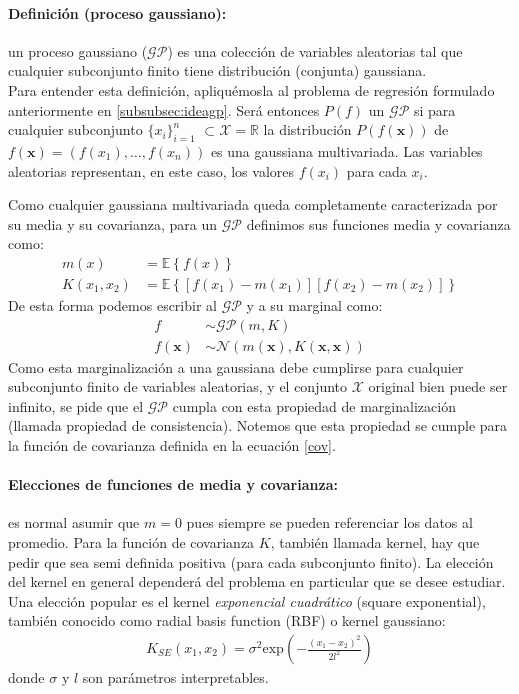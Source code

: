 \documentclass[a4paper]{article}
\newcommand{\gp}{\ensuremath{\mathcal{GP}}}
\begin{document}
\paragraph{Definición (proceso gaussiano):} un proceso gaussiano ($\gp$) es una colección de variables aleatorias tal que cualquier subconjunto finito tiene distribución (conjunta) gaussiana.\\

Para entender esta definición, apliquémosla al problema de regresión formulado anteriormente en \ref{subsubsec:ideagp}. Será entonces $P(f)$ un $\gp$ si para cualquier subconjunto  $\{x_i\}_{i=1}^n$ $\subset \mathcal{X}=\mathbb{R}$ la distribución $P(f(\mathbf{x}))$ de $f(\mathbf{x})= \left(f(x_1),\dots,f(x_n)\right)$ es una gaussiana multivariada. Las variables aleatorias representan, en este caso, los valores $f(x_i)$ para cada $x_i$.

Como cualquier gaussiana multivariada queda completamente caracterizada por su media y su covarianza, para un $\gp$ definimos sus funciones media y covarianza como:
\begin{align}
	m(x) &= \mathbb{E}\left\{f(x)\right\}\\
	K(x_1,x_2) &= \mathbb{E}\left\{\left[f(x_1)-m(x_1)\right]\left[f(x_2)-m(x_2)\right]\right\} \label{cov}
\end{align}
De esta forma podemos escribir al $\gp$ y a su marginal como:
\begin{align}
	f &\sim \gp(m,K)\\
	f(\mathbf{x}) &\sim \mathcal{N}(m(\mathbf{x}), K(\mathbf{x},\mathbf{x}))
\end{align}
Como esta marginalización a una gaussiana debe cumplirse para cualquier subconjunto finito de variables aleatorias, y el conjunto $\mathcal{X}$ original bien puede ser infinito, se pide que el $\gp$ cumpla con esta propiedad de marginalización (llamada propiedad de consistencia). Notemos que esta propiedad se cumple para la función de covarianza definida en la ecuación \ref{cov}.

\paragraph{Elecciones de funciones de media y covarianza:} es normal asumir que $m=0$ pues siempre se pueden referenciar los datos al promedio. Para la función de covarianza $K$, también llamada kernel, hay que pedir que sea semi definida positiva (para cada subconjunto finito). La elección del kernel en general dependerá del problema en particular que se desee estudiar. Una elección popular es el kernel \emph{exponencial cuadrático} (square exponential), también conocido como radial basis function (RBF) o kernel gaussiano:
\begin{align}
	K_{SE}(x_1,x_2) = \sigma^2 \text{exp}\left(-\frac{(x_1-x_2)^2}{2l^2}\right) \label{covSE}
\end{align} 
donde $\sigma$ y $l$ son parámetros interpretables.
\end{document}
